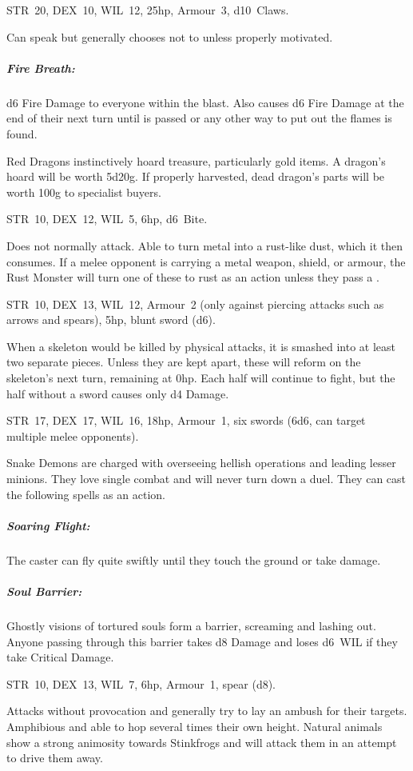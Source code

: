 \documentclass[itdr]{subfiles}
\begin{document}
\break


STR~20, DEX~10, WIL~12, 25hp, Armour~3, d10~Claws.

Can speak but generally chooses not to unless properly motivated.

\subparagraph{Fire Breath:} d6 Fire Damage to everyone within the blast. Also causes d6 Fire Damage at the end of their next turn until  is passed or any other way to put out the flames is found.

Red Dragons instinctively hoard treasure, particularly gold items. A dragon's hoard will be worth 5d20g. If properly harvested, dead dragon's parts will be worth 100g to specialist buyers.


STR~10, DEX~12, WIL~5, 6hp, d6~Bite.

Does not normally attack. Able to turn metal into a rust-like dust, which it then consumes. If a melee opponent is carrying a metal weapon, shield, or armour, the Rust Monster will turn one of these to rust as an action unless they pass a .

STR~10, DEX~13, WIL~12, Armour~2 (only against piercing attacks such as arrows and spears), 5hp, blunt sword (d6).

When a skeleton would be killed by physical attacks, it is smashed into at least two separate pieces. Unless they are kept apart, these will reform on the skeleton's next turn, remaining at 0hp. Each half will continue to fight, but the half without a sword causes only d4 Damage.


\vfill
\break


STR~17, DEX~17, WIL~16, 18hp, Armour~1, six swords (6d6, can target multiple melee opponents).

Snake Demons are charged with overseeing hellish operations and leading lesser minions. They love single combat and will never turn down a duel. They can cast the following spells as an action.

\subparagraph{Soaring Flight:} The caster can fly quite swiftly until they touch the ground or take damage.

\subparagraph{Soul Barrier:} Ghostly visions of tortured souls form a barrier, screaming and lashing out. Anyone passing through this barrier takes d8 Damage and loses d6~WIL if they take Critical Damage.


STR~10, DEX~13, WIL~7, 6hp, Armour~1, spear (d8).

Attacks without provocation and generally try to lay an ambush for their targets. Amphibious and able to hop several times their own height. Natural animals show a strong animosity towards Stinkfrogs and will attack them in an attempt to drive them away.

\end{document}
